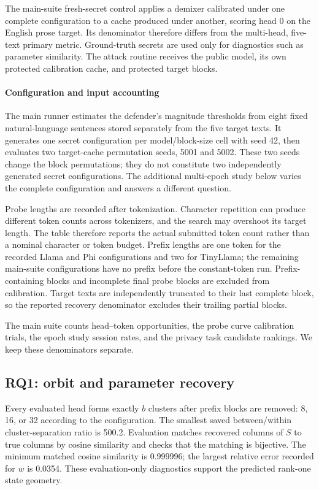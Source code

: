 The main-suite fresh-secret control applies a demixer calibrated under one complete configuration to a cache produced under another, scoring head 0 on the English prose target. Its denominator therefore differs from the multi-head, five-text primary metric. Ground-truth secrets are used only for diagnostics such as parameter similarity. The attack routine receives the public model, its own protected calibration cache, and protected target blocks.

\paragraph{Configuration and input accounting}
The main runner estimates the defender's magnitude thresholds from eight fixed natural-language sentences stored separately from the five target texts. It generates one secret configuration per model/block-size cell with seed 42, then evaluates two target-cache permutation seeds, 5001 and 5002. These two seeds change the block permutations; they do not constitute two independently generated secret configurations. The additional multi-epoch study below varies the complete configuration and answers a different question.

Probe lengths are recorded after tokenization. Character repetition can produce different token counts across tokenizers, and the search may overshoot its target length. The table therefore reports the actual submitted token count rather than a nominal character or token budget. Prefix lengths are one token for the recorded Llama and Phi configurations and two for TinyLlama; the remaining main-suite configurations have no prefix before the constant-token run. Prefix-containing blocks and incomplete final probe blocks are excluded from calibration. Target texts are independently truncated to their last complete block, so the reported recovery denominator excludes their trailing partial blocks.

The main suite counts head--token opportunities, the probe curve calibration trials, the epoch study session rates, and the privacy task candidate rankings. We keep these denominators separate.

\subsection{RQ1: orbit and parameter recovery}
Every evaluated head forms exactly $b$ clusters after prefix blocks are removed: 8, 16, or 32 according to the configuration. The smallest saved between/within cluster-separation ratio is 500.2. Evaluation matches recovered columns of $S$ to true columns by cosine similarity and checks that the matching is bijective. The minimum matched cosine similarity is 0.999996; the largest relative error recorded for $w$ is 0.0354. These evaluation-only diagnostics support the predicted rank-one state geometry.

